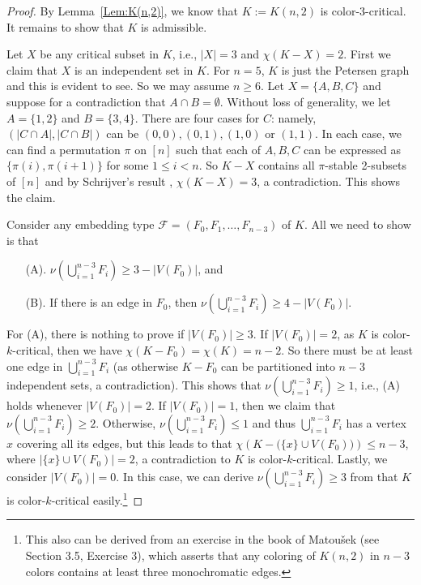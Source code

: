 \documentclass[10pt]{article}
\begin{document}
\begin{proof}
By Lemma~\ref{Lem:K(n,2)}, we know that $K:=K(n,2)$ is color-$3$-critical.
It remains to show that $K$ is admissible.

Let $X$ be any critical subset in $K$, i.e., $|X|=3$ and $\chi(K-X)=2$.
First we claim that $X$ is an independent set in $K$.
For $n=5$, $K$ is just the Petersen graph and this is evident to see.
So we may assume $n\geq 6$.
Let $X=\{A, B, C\}$ and suppose for a contradiction that $A\cap B=\emptyset$.
Without loss of generality, we let $A=\{1,2\}$ and $B=\{3,4\}$.
There are four cases for $C$: namely, $(|C\cap A|, |C\cap B|)$ can be $(0,0), (0,1), (1,0)$ or $(1,1)$.
In each case, we can find a permutation $\pi$ on $[n]$ such that each of $A,B,C$ can be expressed as $\{\pi(i), \pi(i+1)\}$ for some $1\leq i<n$.
So $K-X$ contains all $\pi$-stable 2-subsets of $[n]$ and by Schrijver's result \cite{Sch78}, $\chi(K-X)=3$, a contradiction.
This shows the claim.

Consider any embedding type $\mathcal{F}=(F_0, F_1,\ldots,F_{n-3})$ of $K$.
All we need to show is that
\begin{itemize}
\item [(A).] $\nu(\bigcup_{i=1}^{n-3}F_i)\geq 3-|V(F_0)|$, and
\item [(B).] If there is an edge in $F_0$, then $\nu(\bigcup_{i=1}^{n-3}F_i)\geq 4-|V(F_0)|$.
\end{itemize}
For (A), there is nothing to prove if $|V(F_0)|\geq 3$.
If $|V(F_0)|=2$, as $K $ is color-$k$-critical, then we have $\chi(K-F_0)=\chi(K)=n-2$.
So there must be at least one edge in $\bigcup_{i=1}^{n-3}F_i$ (as otherwise $K-F_0$ can be partitioned into $n-3$ independent sets, a contradiction).
This shows that $\nu(\bigcup_{i=1}^{n-3}F_i)\geq 1$, i.e., (A) holds whenever $|V(F_0)|=2$.
If $|V(F_0)|=1$, then we claim that $\nu(\bigcup_{i=1}^{n-3}F_i)\geq 2$.
Otherwise, $\nu(\bigcup_{i=1}^{n-3}F_i)\leq 1$ and thus $\bigcup_{i=1}^{n-3}F_i$ has a vertex $x$ covering all its edges,
but this leads to that $\chi\left(K-\big(\{x\}\cup V(F_0)\big)\right)\leq n-3$, where $|\{x\}\cup V(F_0)|=2$, a contradiction to $K$ is color-$k$-critical.
Lastly, we consider $|V(F_0)|=0$.
In this case, we can derive $\nu(\bigcup_{i=1}^{n-3}F_i)\geq 3$ from that $K$ is color-$k$-critical easily.\footnote{This also can be derived from an exercise in the book of Matou\v{s}ek \cite{Mat03} (see Section 3.5, Exercise 3), which asserts that any coloring of $K(n,2)$ in $n-3$ colors contains at least three monochromatic edges.}


\end{proof}
\end{document}
